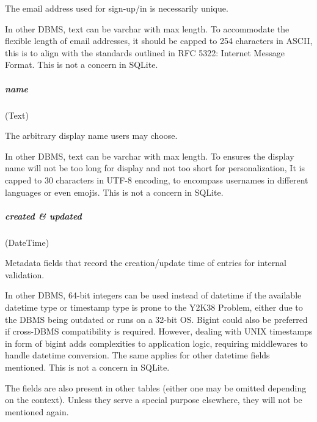 The email address used for sign-up/in is necessarily unique.

\textdagger{} In other DBMS, text can be varchar with max length. To accommodate
the flexible length of email addresses, it should be capped to 254 characters in
ASCII, this is to align with the standards outlined in RFC 5322: Internet
Message Format. This is not a concern in SQLite.

\subparagraph{name}
(Text)

The arbitrary display name users may choose.

\textdagger{} In other DBMS, text can be varchar with max length. To ensures the
display name will not be too long for display and not too short for
personalization, It is capped to 30 characters in UTF-8 encoding, to encompass
usernames in different languages or even emojis. This is not a concern in SQLite.

\subparagraph{created \& updated}
(DateTime)

Metadata fields that record the creation/update time of entries for internal validation.

\textdagger{} In other DBMS, 64-bit integers can be used instead of datetime if the
available datetime type or timestamp type is prone to the Y2K38 Problem, either
due to the DBMS being outdated or runs on a 32-bit OS. Bigint could also be preferred
if cross-DBMS compatibility is required. However, dealing with UNIX timestamps in
form of bigint adds complexities to application logic, requiring middlewares to
handle datetime conversion. The same applies for other datetime fields mentioned.
This is not a concern in SQLite.

The fields are also present in other tables (either one may be omitted depending
on the context). Unless they serve a special purpose elsewhere, they will not be
mentioned again.